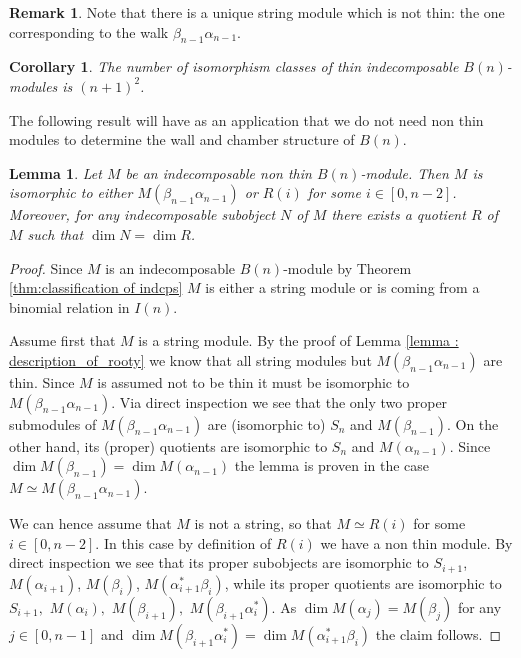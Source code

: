 \documentclass[11pt]{amsart}
\newtheorem{corollary}[theorem]{Corollary}
\newtheorem{lemma}[theorem]{Lemma}
\theoremstyle{definition}
\newtheorem{remark}[theorem]{Remark}
\begin{document}
\begin{remark}
    Note that there is a unique string module which is not thin: the one corresponding to the walk $\beta_{n-1}\alpha_{n-1}$.
\end{remark}
\begin{corollary}\label{cor : number of bricks}
    The number of isomorphism classes of thin indecomposable $B(n)$-modules is $(n+1)^2$.
\end{corollary}

The following result will have as an application that we do not need non thin modules to determine the wall and chamber structure of $B(n)$.

\begin{lemma}\label{lemma : subobjs and quots of non thin }
    Let $M$ be an indecomposable non thin $B(n)$-module. Then $M$ is isomorphic to either $M(\beta_{n-1}\alpha_{n-1})$ or $R(i)$ for some $i\in [0,n-2]$. Moreover, 
    for any indecomposable subobject $N$ of $M$  there exists a quotient $R$ of $M$ such that $\dim N=\dim R$.
\end{lemma}
\begin{proof} Since $M$ is an indecomposable $B(n)$-module by Theorem \ref{thm:classification of indcps} $M$ is either a string module or is coming from a binomial relation in $I(n)$. 

Assume first that $M$ is a string module. By the proof of Lemma \ref{lemma : description_of_rooty} we know that all string modules but $M(\beta_{n-1}\alpha_{n-1})$ are thin.  Since $M$ is assumed not to be thin it must be  isomorphic to $M(\beta_{n-1}\alpha_{n-1})$. 
Via direct inspection we see that the only two proper submodules of $M(\beta_{n-1}\alpha_{n-1})$ are (isomorphic to) $S_{n}$ and $M(\beta_{n-1})$. On the other hand, its (proper) quotients are isomorphic to $S_n$ and $M(\alpha_{n-1})$. Since $\dim M(\beta_{n-1})=\dim M(\alpha_{n-1})$ the lemma is proven in the case $M\simeq M(\beta_{n-1}\alpha_{n-1})$.

We can hence assume that $M$ is not a string, so that $M\simeq R(i)$ for some $i\in[0,n-2]$. In this case by definition of $R(i)$ we have a non thin module. 
By direct inspection we see that  its proper subobjects are isomorphic to  $S_{i+1}$, $M(\alpha_{i+1})$, $M(\beta_i)$, $M(\alpha_{i+1}^*\beta_i)$, while its proper quotients are isomorphic to $S_{i+1},$ $M(\alpha_i),$ $M(\beta_{i+1}),$ $M(\beta_{i+1}\alpha_i^*)$.
As $\dim M(\alpha_j)=M(\beta_j)$ for any $j\in[0,n-1]$ and $\dim M(\beta_{i+1}\alpha_i^*)=\dim M(\alpha_{i+1}^*\beta_i)$ the claim follows.
\end{proof}
\end{document}
